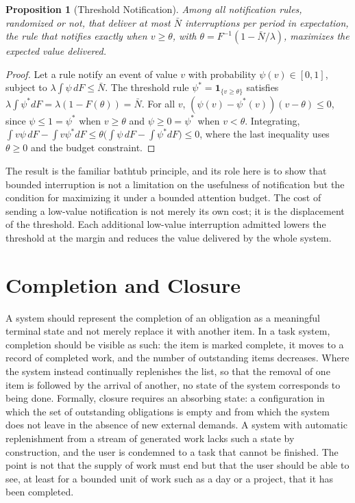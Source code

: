 \documentclass[11pt]{report}
\newtheorem{proposition}[theorem]{Proposition}
\theoremstyle{definition}
\theoremstyle{remark}
\begin{document}
\begin{proposition}[Threshold Notification]\label{prop:threshold}
Among all notification rules, randomized or not, that deliver at most $\bar N$ interruptions per period in expectation, the rule that notifies exactly when $v\ge\theta$, with $\theta=F^{-1}(1-\bar N/\lambda)$, maximizes the expected value delivered.
\end{proposition}

\begin{proof}
Let a rule notify an event of value $v$ with probability $\psi(v)\in[0,1]$, subject to $\lambda\int\psi\,dF\le\bar N$. The threshold rule $\psi^\ast=\mathbf 1_{\{v\ge\theta\}}$ satisfies $\lambda\int\psi^\ast dF=\lambda(1-F(\theta))=\bar N$. For all $v$, $(\psi(v)-\psi^\ast(v))(v-\theta)\le0$, since $\psi\le1=\psi^\ast$ when $v\ge\theta$ and $\psi\ge0=\psi^\ast$ when $v<\theta$. Integrating, $\int v\psi\,dF-\int v\psi^\ast dF\le\theta\bigl(\int\psi\,dF-\int\psi^\ast dF\bigr)\le0$, where the last inequality uses $\theta\ge0$ and the budget constraint.
\end{proof}

The result is the familiar bathtub principle, and its role here is to show that bounded interruption is not a limitation on the usefulness of notification but the condition for maximizing it under a bounded attention budget. The cost of sending a low-value notification is not merely its own cost; it is the displacement of the threshold. Each additional low-value interruption admitted lowers the threshold at the margin and reduces the value delivered by the whole system.

\section{Completion and Closure}

A system should represent the completion of an obligation as a meaningful terminal state and not merely replace it with another item. In a task system, completion should be visible as such: the item is marked complete, it moves to a record of completed work, and the number of outstanding items decreases. Where the system instead continually replenishes the list, so that the removal of one item is followed by the arrival of another, no state of the system corresponds to being done. Formally, closure requires an absorbing state: a configuration in which the set of outstanding obligations is empty and from which the system does not leave in the absence of new external demands. A system with automatic replenishment from a stream of generated work lacks such a state by construction, and the user is condemned to a task that cannot be finished. The point is not that the supply of work must end but that the user should be able to see, at least for a bounded unit of work such as a day or a project, that it has been completed.
\end{document}
